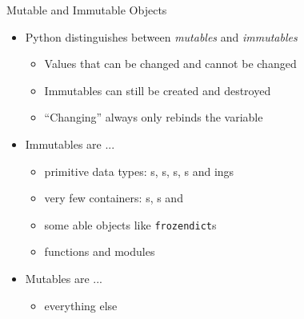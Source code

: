 \begin{frame}{Mutable and Immutable Objects}
%
\begin{itemize}
\item Python distinguishes between \emph{mutables} and \emph{immutables}
	\begin{itemize}
	\item Values that can be changed and cannot be changed
	\item Immutables can still be created and destroyed
	\item \enquote{Changing} always only rebinds the variable
	\end{itemize}
\item Immutables are ...
	\begin{itemize}
	\item primitive data types: s, s, s, s and ings
	\item very few containers: s, s and 
	\item some able objects like \texttt{frozendict}s
	\item functions and modules
	\end{itemize}
\item Mutables are ...
	\begin{itemize}
	\item everything else
	\end{itemize}
\end{itemize}
%
\end{frame}



